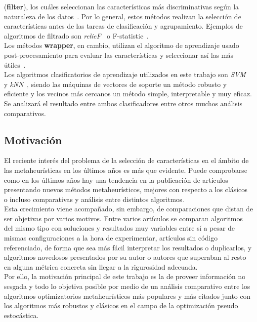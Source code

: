 (\textbf{filter}), los cuáles seleccionan las características más discriminativas según la naturaleza de los datos~\cite{miao_survey_2016}.
Por lo general, estos métodos realizan la selección de características antes de las tareas de clasificación y
agrupamiento. Ejemplos de algoritmos de filtrado son \textit{relieF}~\cite{kira_practical_1992} o F-statistic~\cite{ding_minimum_2005}.\\[6pt]
Los métodos \textbf{wrapper}, en cambio, utilizan el algoritmo de aprendizaje usado post-procesamiento
para evaluar las características y seleccionar así las más útiles~\cite{miao_survey_2016}.\\[6pt]
Los algoritmos clasificatorios de aprendizaje utilizados en este trabajo son \textit{SVM}~\cite{cortes_support-vector_1995}
y \textit{kNN}~\cite{fix_discriminatory_1989,cover_nearest_1967}, siendo las máquinas de vectores de
soporte un método robusto y eficiente y los vecinos más cercanos un método simple, interpretable
y muy eficaz. Se analizará el resultado entre ambos clasificadores entre otros muchos análisis comparativos.

\subsection{Motivación}
El reciente interés del problema de la selección de características en el ámbito de las
metaheurísticas en los últimos años es más que evidente. Puede comprobarse como en los
últimos años hay una tendencia en la publicación de artículos presentando nuevos métodos
metaheurísticos, mejores con respecto a los clásicos o incluso comparativas y análisis entre
distintos algoritmos.\\[6pt]

Esta crecimiento viene acompañado, sin embargo, de comparaciones que distan de ser objetivas
por varios motivos. Entre varios artículos se comparan algoritmos del mismo tipo con
soluciones y resultados muy variables entre sí a pesar de mismas configuraciones a la hora
de experimentar, artículos sin código referenciado, de forma que sea más fácil interpretar
los resultados o duplicarlos, y algoritmos novedosos presentados por su autor o autores que
superaban al resto en alguna métrica concreta sin llegar a la rigurosidad adecuada.\\[6pt]

Por ello, la motivación principal de este trabajo es la de proveer información no sesgada y
todo lo objetiva posible por medio de un análisis comparativo entre los
algoritmos optimizatorios metaheurísticos más populares y más citados junto con los
algoritmos más robustos y clásicos en el campo de la optimización pseudo estocástica.

